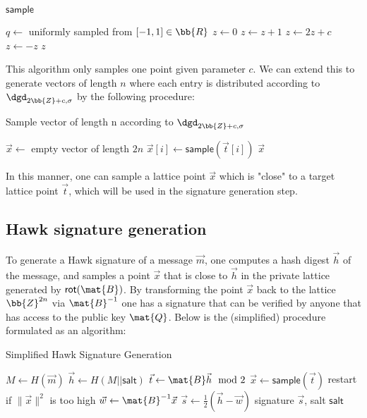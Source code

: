 \begin{algorithm}[H]
\caption{$\mathsf{sample}$}
\begin{algorithmic}[1]
    \State $q \gets$ uniformly sampled from $[-1, 1] \in \bb{R}$
    \State $z \gets 0$
    \State $z \gets z + 1$
    \Else
    \State $z \gets 2z + c$
    \State $z \gets -z$
    \EndIf
    \EndIf
    \EndWhile
    \State \Return $z$
\end{algorithmic}
\end{algorithm}

This algorithm only samples one point given parameter $c$.
We can extend this to generate vectors of length $n$ where each entry is distributed according to $\dgd_{2\bb{Z}+c, \sigma}$ by the following procedure:
\begin{algorithm}[H]
\caption{Sample vector of length n according to $\dgd_{2\bb{Z}+c, \sigma}$}
\begin{algorithmic}[1]
    \State $\vec{x} \gets$ empty vector of length $2n$
    \State $\vec{x}[i] \gets \mathsf{sample}(\vec{t}[i])$
    \EndFor
    \Return $\vec{x}$
\end{algorithmic}
\end{algorithm}

In this manner, one can sample a lattice point $\vec{x}$ which is "close" to a target lattice point $\vec{t}$, which will be used in the signature generation step.

\subsection{Hawk signature generation}
To generate a Hawk signature of a message $\vec{m}$, one computes a hash digest $\vec{h}$ of the message, and samples a point $\vec{x}$ that is close to $\vec{h}$ in the 
private lattice generated by $\mathsf{rot}(\mat{B})$. By transforming the point $\vec{x}$ back to the lattice $\bb{Z}^{2n}$ via $\mat{B}^{-1}$ one has a signature that can be verified 
by anyone that has access to the public key $\mat{Q}$.
Below is the (simplified) procedure formulated as an algorithm:
\begin{algorithm}
\caption{Simplified Hawk Signature Generation}
\begin{algorithmic}[1]
    \State $M \gets H(\vec{m})$ 
    \State $\vec{h} \gets H(M || \mathsf{salt})$ 
    \State $\vec{t} \gets \mat{B} \vec{h} \mod 2$ 
    \State $\vec{x} \gets \mathsf{sample}(\vec{t})$
    \State restart if $\lVert \vec{x} \rVert ^2$ is too high
    \State $\vec{w} \gets \mat{B}^{-1} \vec{x}$
    \State $\vec{s} \gets \frac{1}{2}(\vec{h} - \vec{w})$
    \State \Return signature $\vec{s}$, salt $\mathsf{salt}$
\end{algorithmic}
\end{algorithm}
